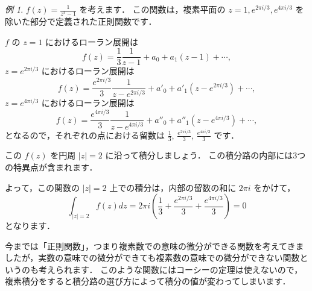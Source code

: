 \documentclass{ltjsarticle}
\newcommand{\abs}[1]{\left\lvert #1\right\rvert}
\theoremstyle{definition}
\theoremstyle{remark}
\newtheorem{example}{例}
\begin{document}
\begin{example}
  $f(z)=\frac{1}{z^3-1}$
  を考えます．
  この関数は，複素平面の $z=1,e^{2\pi i/3},e^{4\pi i/3}$ を除いた部分で定義された正則関数です．

  $f$ の $z=1$ におけるローラン展開は
  \[
  f(z)
  =\frac{1}{3}\frac{1}{z-1}+a_0+a_1(z-1)+\dotsb, %
  \]
  $z=e^{2\pi i/3}$ におけるローラン展開は
  \[
  f(z)
  =\frac{e^{2\pi i/3}}{3}\frac{1}{z-e^{2\pi i/3}}+a'_0+a'_1(z-e^{2\pi i/3})+\dotsb, %
  \]
  $z=e^{4\pi i/3}$ におけるローラン展開は
  \[
  f(z)
  =\frac{e^{4\pi i/3}}{3}\frac{1}{z-e^{4\pi i/3}}+a''_0+a''_1(z-e^{4\pi i/3})+\dotsb,
  \]
  となるので，それぞれの点における留数は $\frac{1}{3}$, $\frac{e^{2\pi i/3}}{3}$, $\frac{e^{4\pi i/3}}{3}$ です．

  この $f(z)$ を円周 $\abs{z}=2$ に沿って積分しましょう．
  この積分路の内部には3つの特異点が含まれます．
  \begin{center}
  \end{center}
  よって，この関数の $\abs{z}=2$ 上での積分は，内部の留数の和に $2\pi i$ をかけて，
  \[\int_{\abs{z}=2} f(z)dz=2\pi i\left(\frac{1}{3}+\frac{e^{2\pi i/3}}{3}+\frac{e^{4\pi i/3}}{3}\right)=0\]
  となります．
\end{example}



今までは「正則関数」，つまり複素数での意味の微分ができる関数を考えてきましたが，実数の意味での微分ができても複素数の意味での微分ができない関数というのも考えられます．
このような関数にはコーシーの定理は使えないので，複素積分をすると積分路の選び方によって積分の値が変わってしまいます．
\end{document}
